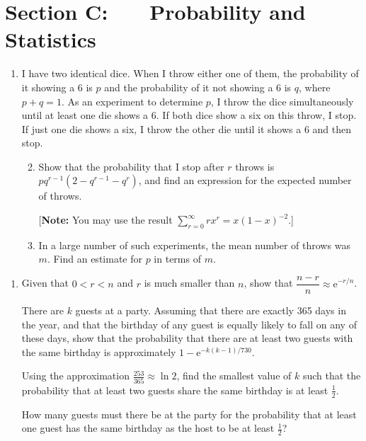 \documentclass[a4, 11pt]{report}
\newlength{\qspace}
\newcounter{qnumber}
\newenvironment{question}%
 {\vspace{\qspace}
  \begin{enumerate}[\bfseries 1\quad][10]%
    \setcounter{enumi}{\value{qnumber}}%
    \item%
 }
{
  \end{enumerate}
  \filbreak
  \stepcounter{qnumber}
 }
\newenvironment{questionparts}[1][1]%
 {
  \begin{enumerate}[\bfseries (i)]%
    \setcounter{enumii}{#1}
    \addtocounter{enumii}{-1}
    \setlength{\itemsep}{5mm}
    \setlength{\parskip}{8pt}
 }
 {
  \end{enumerate}
 }
\def\e{{\mathrm e}}
\newcommand{\ds}{\displaystyle}
\begin{document}
	
	\newpage
\section*{Section C: \ \ \ Probability and Statistics}


\begin{question}
I have two identical dice. When I throw either one of them, the
probability
of it showing a 6 is $p$ and the probability of it not showing a 6 is
$q$,
where $p+q=1$.
As an experiment to determine $p$, I throw the dice simultaneously
until at least one die shows a 6. If both dice show a six on this 
throw, I stop. If just one die shows a six, I throw the other die 
until it shows a 6 and then stop.


\begin{questionparts}
\item Show that the probability that I stop after $r$ throws
is $pq^{r-1}(2-q^{r-1}-q^r)$, and find an expression for the
expected number of throws.

[{\bf Note:} You may use the result $\ds \sum_{r=0}^\infty rx^r =
  x(1-x)^{-2}$.]

\item In a large number of such experiments, the mean number
of throws was $m$. Find an estimate for $p$ in terms of $m$.
\end{questionparts}
\end{question}

\begin{question}
Given that $0<r<n$ and $r$ is much smaller than $n$, show that 
$\dfrac {n-r}n \approx \e^{-r/n}$.

There are $k$ guests at a party. Assuming that there are exactly 365
days 
in the year, and that the birthday of any guest is equally likely to 
fall on any of these days, show that the probability that there are at
least
two guests with the same birthday is approximately $1-\e^{-k(k-1)/730}$.

Using the approximation $ \frac{253}{365} \approx \ln 2$, find the
smallest value of $k$ such that
the probability that at least two guests share the
same birthday is at least  $\frac12$.

How many guests must there be at the party for  the probability 
that at least one guest has the same birthday as the host to be 
at least $\frac12$?


\end{question}
\end{document}
